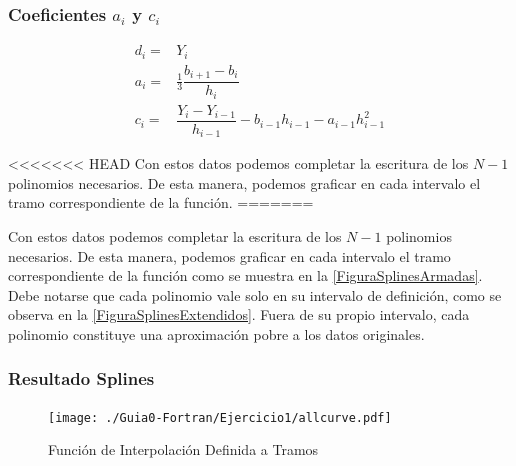 \begin{frame}[label=FrameEquationRecurrencias]
  \frametitle<presentation>{Coeficientes $a_i$ y $c_i$}
  \begin{equation}
    \begin{aligned}
      d_i =& Y_i \\
      a_i =& \frac{1}{3} \dfrac{ b_{i+1} - b_i }{h_i} \\
      c_i =& \dfrac{ Y_i - Y_{i-1} }{ h_{i-1} } - b_{i-1} h_{i-1}  - a_{i-1} h_{i-1} ^2
    \end{aligned}
  \end{equation}


\end{frame}
<<<<<<< HEAD
Con estos datos podemos completar la escritura de los $N-1$ polinomios
necesarios. De esta manera, podemos graficar en cada intervalo 
el tramo correspondiente de la función.
=======

Con estos datos podemos completar la escritura de los $N-1$ polinomios
necesarios. De esta manera, podemos graficar en cada intervalo 
el tramo correspondiente de la función como se muestra en la
\autoref{FiguraSplinesArmadas}. Debe notarse que cada polinomio vale solo
en su intervalo de definición, como se observa en la \autoref{FiguraSplinesExtendidos}.
Fuera de su propio intervalo, cada polinomio constituye una aproximación pobre
a los datos originales. 

\mode*
\begin{frame}[label=FrameFiguraSplinesArmadas]
  \frametitle<presentation>{Resultado Splines}
  \begin{figure}
    \center
    \texttt{[image: ./Guia0-Fortran/Ejercicio1/allcurve.pdf]}
    \caption{\label{FiguraSplinesArmadas}Función de Interpolación Definida a Tramos}
  \end{figure}
\end{frame}

